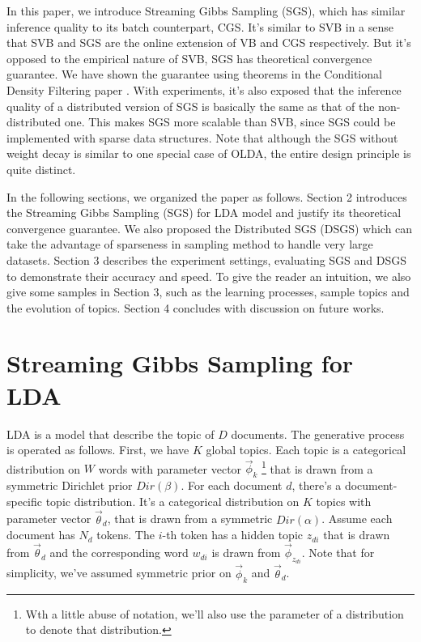 \documentclass{article}
\begin{document}
In this paper, we introduce Streaming Gibbs Sampling (SGS), which has similar inference quality to its batch counterpart, CGS. It's similar to SVB in a sense that SVB and SGS are the online extension of VB and CGS respectively. But it's opposed to the empirical nature of SVB, SGS has theoretical convergence guarantee. We have shown the guarantee using theorems in the Conditional Density Filtering paper \cite{guhaniyogi2014bayesian}. With experiments, it's also exposed that the inference quality of a distributed version of SGS is basically the same as that of the non-distributed one. This makes SGS more scalable than SVB, since SGS could be implemented with sparse data structures. Note that although the SGS without weight decay is similar to one special case of OLDA, the entire design principle is quite distinct.

In the following sections, we organized the paper as follows. Section 2 introduces the Streaming Gibbs Sampling (SGS) for LDA model and justify its theoretical convergence guarantee. We also proposed the Distributed SGS (DSGS) which can take the advantage of sparseness in sampling method to handle very large datasets. Section 3 describes the experiment settings, evaluating SGS and DSGS to demonstrate their accuracy and speed. To give the reader an intuition, we also give some samples in Section 3, such as the learning processes, sample topics and the evolution of topics. Section 4 concludes with discussion on future works. 



\section{Streaming Gibbs Sampling for LDA} 
 
LDA is a model that describe the topic of $D$ documents. The generative process is operated as follows. First, we have $K$ global topics. Each topic is a categorical distribution on $W$ words with parameter vector $\vec{\phi}_k$ \footnote{Wth a little abuse of notation, we'll also use the parameter of a distribution to denote that distribution.} that is drawn from a symmetric Dirichlet prior $Dir(\beta)$. For each document $d$, there's a document-specific topic distribution. It's a categorical distribution on $K$ topics with parameter vector  $\vec{\theta}_d$, that is drawn from a symmetric $Dir(\alpha)$. Assume each document has $N_d$ tokens. The $i$-th token has a hidden topic $z_{di}$ that is drawn from $\vec{\theta}_d$ and the corresponding word $w_{di}$ is drawn from $\vec{\phi}_{z_{di}}$. Note that for simplicity, we've assumed symmetric prior on $\vec{\phi}_k$ and $\vec{\theta}_d$. 
\end{document}
